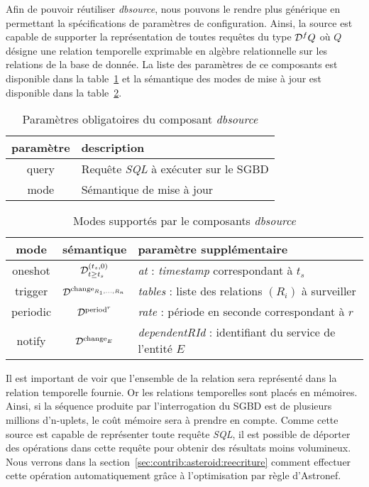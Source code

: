 Afin de pouvoir réutiliser \textit{dbsource}, nous pouvons le rendre plus générique en permettant la spécifications de paramètres de configuration. Ainsi, la source est capable de supporter la représentation de toutes requêtes du type $\mathcal{D}^f Q$ où $Q$ désigne une relation temporelle exprimable en algèbre relationnelle sur les relations de la base de donnée. La liste des paramètres de ce composants est disponible dans la table~\ref{tab:contrib:asteroid:dbsource} et la sémantique des modes de mise à jour est disponible dans la table~\ref{tab:contrib:asteroid:dbsource:modes}.
\begin{table}[ht]
    \centering
    \begin{tabular}{cl}
        paramètre & description \\ \midrule
        query & Requête \textit{SQL} à exécuter sur le SGBD \\
        mode & Sémantique de mise à jour
    \end{tabular}
    \caption{Paramètres obligatoires du composant \textit{dbsource}}\label{tab:contrib:asteroid:dbsource}
\end{table}
\begin{table}[ht]
    \centering
    \begin{tabular}{ccl}
        mode & sémantique & paramètre supplémentaire \\ \midrule
        oneshot & $\mathcal{D}^{(t_s,0)}_{t\geq t_s}$ & \textit{at} : \textit{timestamp} correspondant à $t_s$\\
        trigger & $\mathcal{D}^{\mathrm{change}_{R_1,...,R_n}}$ & \textit{tables} : liste des relations $(R_i)$ à surveiller \\
        periodic & $\mathcal{D}^{\mathrm{period}^{r}}$ & \textit{rate} : période en seconde correspondant à $r$\\
        notify & $\mathcal{D}^{\mathrm{change}_{E}}$ & \textit{dependentRId} : identifiant du service de l'entité $E$
    \end{tabular}
    \caption{Modes supportés par le composants \textit{dbsource}}\label{tab:contrib:asteroid:dbsource:modes}
\end{table}

Il est important de voir que l'ensemble de la relation sera représenté dans la relation temporelle fournie. Or les relations temporelles sont placés en mémoires. Ainsi, si la séquence produite par l'interrogation du SGBD est de plusieurs millions d'n-uplets, le coût mémoire sera à prendre en compte. Comme cette source est capable de représenter toute requête \textit{SQL}, il est possible de déporter des opérations dans cette requête pour obtenir des résultats moins volumineux. Nous verrons dans la section~\ref{sec:contrib:asteroid:reecriture} comment effectuer cette opération automatiquement grâce à l'optimisation par règle d'Astronef.

